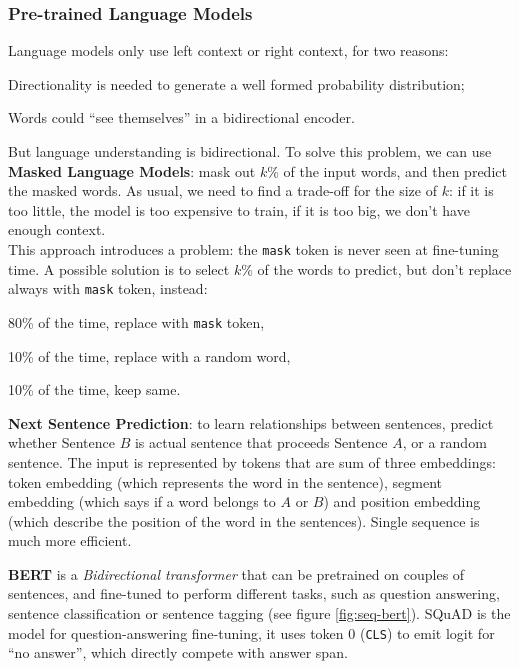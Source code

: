 \subsubsection{Pre-trained Language Models}\label{sec:seq-pre-trained}

Language models only use left context or right context, for two reasons:
\begin{myenum}
    \item Directionality is needed to generate a well formed probability distribution;
    \item Words could “see themselves” in a bidirectional encoder.
\end{myenum}
But language understanding is bidirectional. To solve this problem, we can use \textbf{Masked Language Models}: mask out $k\%$ of the input words, and then predict the masked words. As usual, we need to find a trade-off for the size of $k$: if it is too little, the model is too expensive to train, if it is too big, we don't have enough context.\\
This approach introduces a problem: the \texttt{mask} token is never seen at fine-tuning time. A possible solution is to select $k\%$ of the words to predict, but don't replace always with \texttt{mask} token, instead:
\begin{myitem}
    \item 80\% of the time, replace with \texttt{mask} token,
    \item 10\% of the time, replace with a random word,
    \item 10\% of the time, keep same.
\end{myitem}

\textbf{Next Sentence Prediction}: to learn relationships between sentences, predict whether Sentence $B$ is actual sentence that proceeds Sentence $A$, or a random sentence. The input is represented by tokens that are sum of three embeddings: token embedding (which represents the word in the sentence), segment embedding (which says if a word belongs to $A$ or $B$) and position embedding (which describe the position of the word in the sentences). Single sequence is much more efficient.

\textbf{BERT} is a \textit{Bidirectional transformer} that can be pretrained on couples of sentences, and fine-tuned to perform different tasks, such as question answering, sentence classification or sentence tagging (see figure \ref{fig:seq-bert}). SQuAD is the model for question-answering fine-tuning, it uses token 0 (\texttt{CLS}) to emit logit for ``no answer'', which directly compete with answer span.

